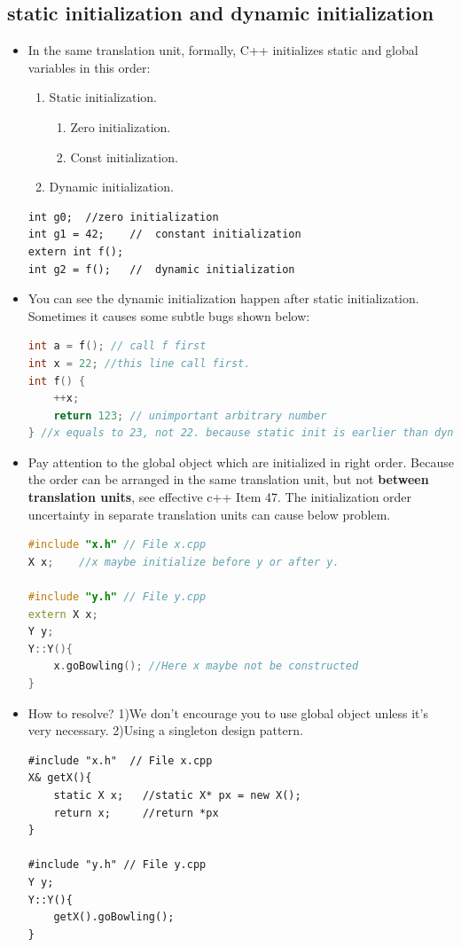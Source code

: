 \documentclass[a4paper,11pt,twoside]{book}
\begin{document}
\subsection{static initialization and dynamic initialization}
\begin{itemize}
	\item In the same translation unit, formally, C++ initializes static and global variables in this order:
	\begin{enumerate}
		\item Static initialization.
			\begin{enumerate}
			\item Zero initialization.
			\item Const initialization.
			\end{enumerate}
		\item Dynamic initialization.
	\end{enumerate}
		
\begin{lstlisting}[numbers=none]
int g0;  //zero initialization
int g1 = 42;    //  constant initialization
extern int f();
int g2 = f();   //  dynamic initialization
\end{lstlisting}

	\item You can see the dynamic initialization happen after static initialization. Sometimes it causes some subtle bugs shown below:
\begin{lstlisting}[frame=single, language=c++, mathescape=true]
int a = f(); // call f first
int x = 22; //this line call first.
int f() {
	++x;
	return 123; // unimportant arbitrary number
} //x equals to 23, not 22. because static init is earlier than dynamic
\end{lstlisting}

	
	\item Pay attention to the global object which are initialized in right order. Because the order can be arranged in the same translation unit, but not \textbf{between translation units}, see effective c++ Item 47. The initialization order uncertainty in separate translation units can cause below problem.
	
\begin{lstlisting}[frame=single, language=c++]
#include "x.h" // File x.cpp
X x;    //x maybe initialize before y or after y.
	
#include "y.h" // File y.cpp
extern X x;
Y y;
Y::Y(){ 
	x.goBowling(); //Here x maybe not be constructed
}
\end{lstlisting}
	
	\item  How to resolve? 1)We don't encourage you to use global object unless it's very necessary. 2)Using a singleton design pattern.
	\begin{lstlisting}[numbers=none]
#include "x.h"  // File x.cpp
X& getX(){
	static X x;   //static X* px = new X();
	return x;     //return *px
}
	
#include "y.h" // File y.cpp
Y y;
Y::Y(){
	getX().goBowling();
}
\end{lstlisting}
\end{itemize}
\end{document}
